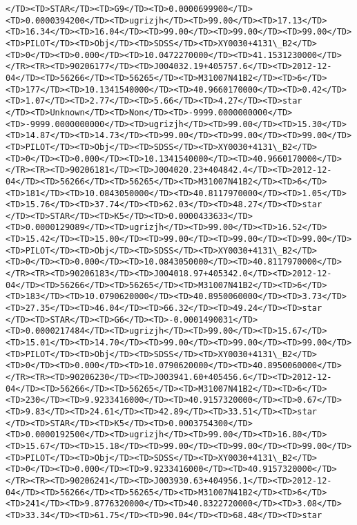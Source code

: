 \documentclass[11pt]{article}
\begin{document}
\begin{Verbatim}[commandchars=\\\{\}]
</TD><TD>STAR</TD><TD>G9</TD><TD>0.0000699900</TD><TD>0.0000394200</TD><TD>ugrizjh</TD><TD>99.00</TD><TD>17.13</TD><TD>16.34</TD><TD>16.04</TD><TD>99.00</TD><TD>99.00</TD><TD>99.00</TD><TD>PILOT</TD><TD>Obj</TD><TD>SDSS</TD><TD>XY0030+4131\_B2</TD><TD>0</TD><TD>0.000</TD><TD>10.0472270000</TD><TD>41.1531230000</TD></TR><TR><TD>90206177</TD><TD>J004032.19+405757.6</TD><TD>2012-12-04</TD><TD>56266</TD><TD>56265</TD><TD>M31007N41B2</TD><TD>6</TD><TD>177</TD><TD>10.1341540000</TD><TD>40.9660170000</TD><TD>0.42</TD><TD>1.07</TD><TD>2.77</TD><TD>5.66</TD><TD>4.27</TD><TD>star      </TD><TD>Unknown</TD><TD>Non</TD><TD>-9999.0000000000</TD><TD>-9999.0000000000</TD><TD>ugrizjh</TD><TD>99.00</TD><TD>15.30</TD><TD>14.87</TD><TD>14.73</TD><TD>99.00</TD><TD>99.00</TD><TD>99.00</TD><TD>PILOT</TD><TD>Obj</TD><TD>SDSS</TD><TD>XY0030+4131\_B2</TD><TD>0</TD><TD>0.000</TD><TD>10.1341540000</TD><TD>40.9660170000</TD></TR><TR><TD>90206181</TD><TD>J004020.23+404842.4</TD><TD>2012-12-04</TD><TD>56266</TD><TD>56265</TD><TD>M31007N41B2</TD><TD>6</TD><TD>181</TD><TD>10.0843050000</TD><TD>40.8117970000</TD><TD>1.05</TD><TD>15.76</TD><TD>37.74</TD><TD>62.03</TD><TD>48.27</TD><TD>star      </TD><TD>STAR</TD><TD>K5</TD><TD>0.0000433633</TD><TD>0.0000129089</TD><TD>ugrizjh</TD><TD>99.00</TD><TD>16.52</TD><TD>15.42</TD><TD>15.00</TD><TD>99.00</TD><TD>99.00</TD><TD>99.00</TD><TD>PILOT</TD><TD>Obj</TD><TD>SDSS</TD><TD>XY0030+4131\_B2</TD><TD>0</TD><TD>0.000</TD><TD>10.0843050000</TD><TD>40.8117970000</TD></TR><TR><TD>90206183</TD><TD>J004018.97+405342.0</TD><TD>2012-12-04</TD><TD>56266</TD><TD>56265</TD><TD>M31007N41B2</TD><TD>6</TD><TD>183</TD><TD>10.0790620000</TD><TD>40.8950060000</TD><TD>3.73</TD><TD>27.35</TD><TD>46.04</TD><TD>66.32</TD><TD>49.24</TD><TD>star      </TD><TD>STAR</TD><TD>G6</TD><TD>-0.0001490031</TD><TD>0.0000217484</TD><TD>ugrizjh</TD><TD>99.00</TD><TD>15.67</TD><TD>15.01</TD><TD>14.70</TD><TD>99.00</TD><TD>99.00</TD><TD>99.00</TD><TD>PILOT</TD><TD>Obj</TD><TD>SDSS</TD><TD>XY0030+4131\_B2</TD><TD>0</TD><TD>0.000</TD><TD>10.0790620000</TD><TD>40.8950060000</TD></TR><TR><TD>90206230</TD><TD>J003941.60+405456.6</TD><TD>2012-12-04</TD><TD>56266</TD><TD>56265</TD><TD>M31007N41B2</TD><TD>6</TD><TD>230</TD><TD>9.9233416000</TD><TD>40.9157320000</TD><TD>0.67</TD><TD>9.83</TD><TD>24.61</TD><TD>42.89</TD><TD>33.51</TD><TD>star      </TD><TD>STAR</TD><TD>K5</TD><TD>0.0003754300</TD><TD>0.0000192500</TD><TD>ugrizjh</TD><TD>99.00</TD><TD>16.80</TD><TD>15.67</TD><TD>15.18</TD><TD>99.00</TD><TD>99.00</TD><TD>99.00</TD><TD>PILOT</TD><TD>Obj</TD><TD>SDSS</TD><TD>XY0030+4131\_B2</TD><TD>0</TD><TD>0.000</TD><TD>9.9233416000</TD><TD>40.9157320000</TD></TR><TR><TD>90206241</TD><TD>J003930.63+404956.1</TD><TD>2012-12-04</TD><TD>56266</TD><TD>56265</TD><TD>M31007N41B2</TD><TD>6</TD><TD>241</TD><TD>9.8776320000</TD><TD>40.8322720000</TD><TD>3.08</TD><TD>33.34</TD><TD>61.75</TD><TD>90.04</TD><TD>68.48</TD><TD>star      
\end{Verbatim}
\end{document}
